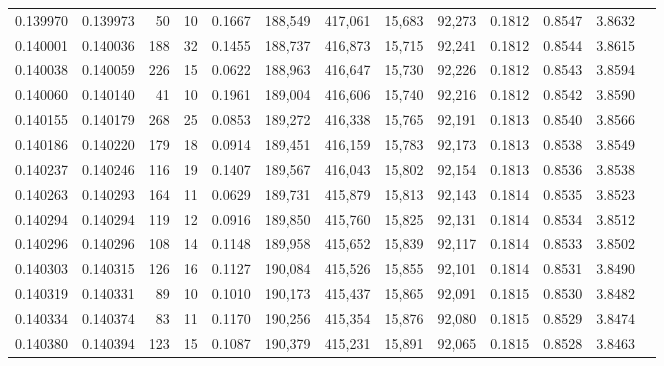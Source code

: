 \begin{tabular}{rrrrrrrrrrrrr}
0.139970 & 0.139973 &    50 &  10 &                                     0.1667 & 188,549 & 417,061 &  15,683 &  92,273 & 0.1812 & 0.8547 & 3.8632 \\
0.140001 & 0.140036 &   188 &  32 &                                     0.1455 & 188,737 & 416,873 &  15,715 &  92,241 & 0.1812 & 0.8544 & 3.8615 \\
0.140038 & 0.140059 &   226 &  15 &                                     0.0622 & 188,963 & 416,647 &  15,730 &  92,226 & 0.1812 & 0.8543 & 3.8594 \\
0.140060 & 0.140140 &    41 &  10 &                                     0.1961 & 189,004 & 416,606 &  15,740 &  92,216 & 0.1812 & 0.8542 & 3.8590 \\
0.140155 & 0.140179 &   268 &  25 &                                     0.0853 & 189,272 & 416,338 &  15,765 &  92,191 & 0.1813 & 0.8540 & 3.8566 \\
0.140186 & 0.140220 &   179 &  18 &                                     0.0914 & 189,451 & 416,159 &  15,783 &  92,173 & 0.1813 & 0.8538 & 3.8549 \\
0.140237 & 0.140246 &   116 &  19 &                                     0.1407 & 189,567 & 416,043 &  15,802 &  92,154 & 0.1813 & 0.8536 & 3.8538 \\
0.140263 & 0.140293 &   164 &  11 &                                     0.0629 & 189,731 & 415,879 &  15,813 &  92,143 & 0.1814 & 0.8535 & 3.8523 \\
0.140294 & 0.140294 &   119 &  12 &                                     0.0916 & 189,850 & 415,760 &  15,825 &  92,131 & 0.1814 & 0.8534 & 3.8512 \\
0.140296 & 0.140296 &   108 &  14 &                                     0.1148 & 189,958 & 415,652 &  15,839 &  92,117 & 0.1814 & 0.8533 & 3.8502 \\
0.140303 & 0.140315 &   126 &  16 &                                     0.1127 & 190,084 & 415,526 &  15,855 &  92,101 & 0.1814 & 0.8531 & 3.8490 \\
0.140319 & 0.140331 &    89 &  10 &                                     0.1010 & 190,173 & 415,437 &  15,865 &  92,091 & 0.1815 & 0.8530 & 3.8482 \\
0.140334 & 0.140374 &    83 &  11 &                                     0.1170 & 190,256 & 415,354 &  15,876 &  92,080 & 0.1815 & 0.8529 & 3.8474 \\
0.140380 & 0.140394 &   123 &  15 &                                     0.1087 & 190,379 & 415,231 &  15,891 &  92,065 & 0.1815 & 0.8528 & 3.8463 \\

\end{tabular}
